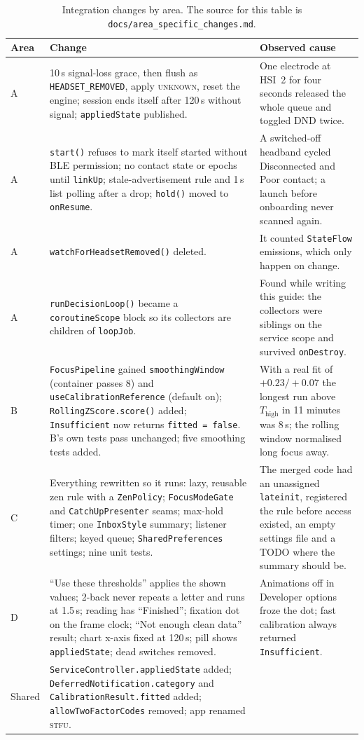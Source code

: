 \documentclass[10pt,a4paper]{article}
\newcommand{\file}[1]{\texttt{\small #1}}          %
\newcommand{\code}[1]{\texttt{#1}}                  %
\newcommand{\state}[1]{\textsc{\small #1}}          %
\newcommand{\Thigh}{T_{\mathrm{high}}}
\begin{document}
\begin{table}[htbp]\centering\small
\begin{tabularx}{\textwidth}{@{}l X X@{}}
\toprule
\textbf{Area} & \textbf{Change} & \textbf{Observed cause} \\
\midrule
A & 10\,s signal-loss grace, then flush as \code{HEADSET\_REMOVED}, apply \state{unknown}, reset the
  engine; session ends itself after 120\,s without signal; \code{appliedState} published. &
  One electrode at HSI~2 for four seconds released the whole queue and toggled DND twice. \\
A & \code{start()} refuses to mark itself started without BLE permission; no contact state or
  epochs until \code{linkUp}; stale-advertisement rule and 1\,s list polling after a drop;
  \code{hold()} moved to \code{onResume}. & A switched-off headband cycled Disconnected and Poor
  contact; a launch before onboarding never scanned again. \\
A & \code{watchForHeadsetRemoved()} deleted. & It counted \code{StateFlow} emissions, which only
  happen on change. \\
A & \code{runDecisionLoop()} became a \code{coroutineScope} block so its collectors are children of
  \code{loopJob}. & Found while writing this guide: the collectors were siblings on the service scope
  and survived \code{onDestroy}. \\
B & \code{FocusPipeline} gained \code{smoothingWindow} (container passes 8) and
  \code{useCalibrationReference} (default on); \code{RollingZScore.score()} added;
  \code{Insufficient} now returns \code{fitted = false}. B's own tests pass unchanged; five
  smoothing tests added. & With a real fit of $+0.23 / +0.07$ the longest run above $\Thigh$ in
  11 minutes was 8\,s; the rolling window normalised long focus away. \\
C & Everything rewritten so it runs: lazy, reusable zen rule with a \code{ZenPolicy};
  \code{FocusModeGate} and \code{CatchUpPresenter} seams; max-hold timer; one \code{InboxStyle}
  summary; listener filters; keyed queue; \code{SharedPreferences} settings; nine unit tests. &
  The merged code had an unassigned \code{lateinit}, registered the rule before access existed,
  an empty settings file and a TODO where the summary should be. \\
D & ``Use these thresholds'' applies the shown values; 2-back never repeats a letter and runs at
  1.5\,s; reading has ``Finished''; fixation dot on the frame clock; ``Not enough clean data''
  result; chart x-axis fixed at 120\,s; pill shows \code{appliedState}; dead switches removed. &
  Animations off in Developer options froze the dot; fast calibration always returned
  \code{Insufficient}. \\
Shared & \code{ServiceController.appliedState} added; \code{DeferredNotification.category} and
  \code{CalibrationResult.fitted} added; \code{allowTwoFactorCodes} removed; app renamed
  \textsc{stfu}. & \\
\bottomrule
\end{tabularx}
\caption{Integration changes by area. The source for this table is
\file{docs/area\_specific\_changes.md}.}\label{tab:integration}
\end{table}
\end{document}
